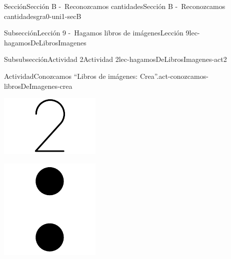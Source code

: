 \documentclass[twoside,10pt,]{article}
\begin{document}
\begin{sectionptx}{Sección}{Sección B -~Reconozcamos cantidades}{}{Sección B -~Reconozcamos cantidades}{}{}{gra0-uni1-secB}
\begin{subsectionptx}{Subsección}{Lección 9 -~Hagamos libros de imágenes}{}{Lección 9}{}{}{lec-hagamosDeLibrosImagenes}
\begin{subsubsectionptx}{Subsubsección}{Actividad 2}{}{Actividad 2}{}{}{lec-hagamosDeLibrosImagenes-act2}
\begin{activity}{Actividad}{Conozcamos “Libros de imágenes: Crea”.}{act-conozcamos-librosDeImagenes-crea}
\begin{sidebyside}{2}{0.3}{0.3}{0}
\begin{sbspanel}{0.2}
\includegraphics[width=\linewidth]{external/svg-source/tikz-file-148155.pdf}
\end{sbspanel}%
\begin{sbspanel}{0.2}%
\includegraphics[width=\linewidth]{external/svg-source/tikz-file-148154.pdf}
\end{sbspanel}%
\end{sidebyside}%
\end{activity}%
\end{subsubsectionptx}
%
%
\typeout{************************************************}

\end{subsectionptx}
\end{sectionptx}
\end{document}
